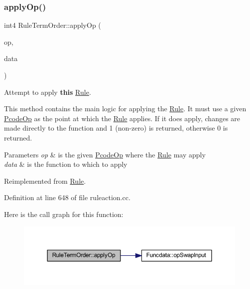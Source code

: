 \subsubsection{\texorpdfstring{applyOp()}{applyOp()}}
{\footnotesize\ttfamily int4 Rule\+Term\+Order\+::apply\+Op (\begin{DoxyParamCaption}\item[{\mbox{\hyperlink{class_pcode_op}{Pcode\+Op}} $\ast$}]{op,  }\item[{\mbox{\hyperlink{class_funcdata}{Funcdata}} \&}]{data }\end{DoxyParamCaption})\hspace{0.3cm}{\ttfamily [virtual]}}



Attempt to apply {\bfseries{this}} \mbox{\hyperlink{class_rule}{Rule}}. 

This method contains the main logic for applying the \mbox{\hyperlink{class_rule}{Rule}}. It must use a given \mbox{\hyperlink{class_pcode_op}{Pcode\+Op}} as the point at which the \mbox{\hyperlink{class_rule}{Rule}} applies. If it does apply, changes are made directly to the function and 1 (non-\/zero) is returned, otherwise 0 is returned. 
\begin{DoxyParams}{Parameters}
{\em op} & is the given \mbox{\hyperlink{class_pcode_op}{Pcode\+Op}} where the \mbox{\hyperlink{class_rule}{Rule}} may apply \\
\hline
{\em data} & is the function to which to apply \\
\hline
\end{DoxyParams}


Reimplemented from \mbox{\hyperlink{class_rule_a4e3e61f066670175009f60fb9dc60848}{Rule}}.



Definition at line 648 of file ruleaction.\+cc.

Here is the call graph for this function\+:
\nopagebreak
\begin{figure}[H]
\begin{center}
\leavevmode
\includegraphics[width=350pt]{class_rule_term_order_a3f3c26d28f966bd5cbc24c056f0c324b_cgraph}
\end{center}
\end{figure}
\mbox{\label{class_rule_term_order_a02f5abd73f44211860e5cdf7f6f9d554}} 
